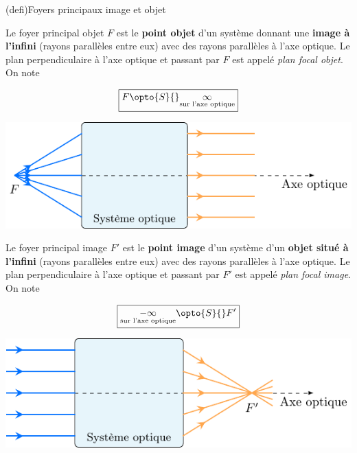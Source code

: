 \documentclass[../../main/main.tex]{subfiles}
\begin{document}
\begin{tcb}[label=def:foy, sidebyside](defi){Foyers principaux image et objet}

	Le foyer principal objet $F$ est le \textbf{point objet} d'un système
	donnant une \textbf{image à l'infini} (rayons parallèles entre eux) avec des
	rayons parallèles à l'axe optique. Le plan perpendiculaire à l'axe optique
	et passant par $F$ est appelé \textit{plan focal objet}. On note

	\[\boxed{F \opto{S}{} \underset{\text{sur l'axe optique}}{\infty}}\]
	\begin{center}
		\includegraphics[width=\linewidth]{fobj.pdf}
		\label{fig:fobj}
	\end{center}

	\tcblower

	Le foyer principal image $F'$ est le \textbf{point image} d'un système d'un
	\textbf{objet situé à l'infini} (rayons parallèles entre eux) avec des
	rayons parallèles à l'axe optique. Le plan perpendiculaire à l'axe optique
	et passant par $F'$ est appelé \textit{plan focal image}. On note

	\[\boxed{\underset{\text{sur l'axe optique}}{-\infty} \opto{S}{} F'}\]
	\begin{center}
		\includegraphics[width=\linewidth]{fimg.pdf}
		\label{fig:fimg}
	\end{center}

\end{tcb}
\end{document}
